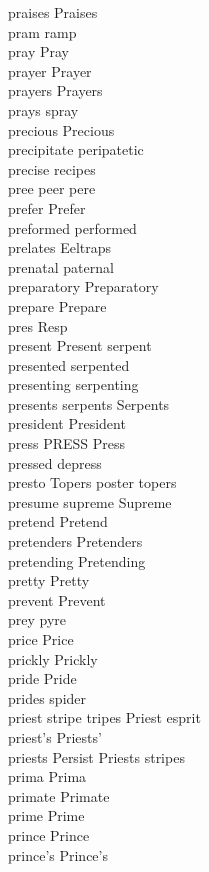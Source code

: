 praises Praises\\
pram ramp\\
pray Pray\\
prayer Prayer\\
prayers Prayers\\
prays spray\\
precious Precious\\
precipitate peripatetic\\
precise recipes\\
pree peer pere\\
prefer Prefer\\
preformed performed\\
prelates Eeltraps\\
prenatal paternal\\
preparatory Preparatory\\
prepare Prepare\\
pres Resp\\
present Present serpent\\
presented serpented\\
presenting serpenting\\
presents serpents Serpents\\
president President\\
press PRESS Press\\
pressed depress\\
presto Topers poster topers\\
presume supreme Supreme\\
pretend Pretend\\
pretenders Pretenders\\
pretending Pretending\\
pretty Pretty\\
prevent Prevent\\
prey pyre\\
price Price\\
prickly Prickly\\
pride Pride\\
prides spider\\
priest stripe tripes Priest esprit\\
priest's Priests'\\
priests Persist Priests stripes\\
prima Prima\\
primate Primate\\
prime Prime\\
prince Prince\\
prince's Prince's\\
